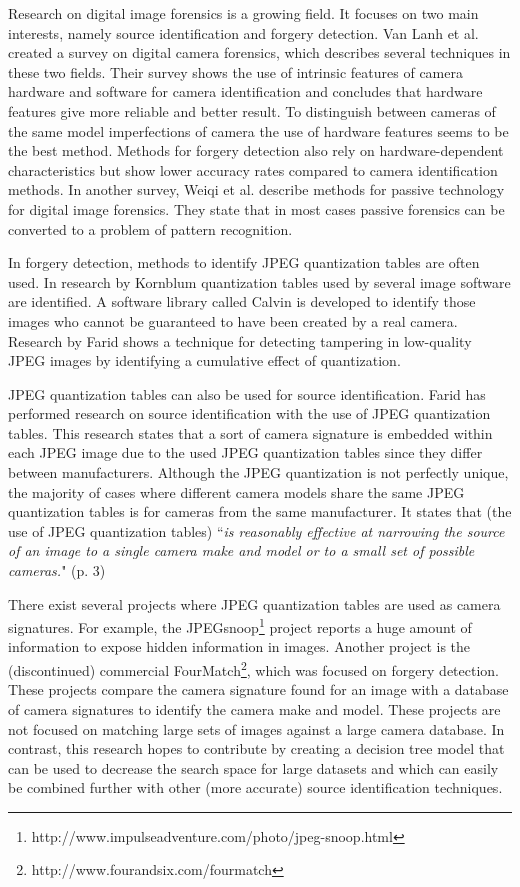 Research on digital image forensics is a growing field. It focuses on two main interests, namely source identification and forgery detection. Van Lanh et al. \cite{van2007survey} created a survey on digital camera forensics, which describes several techniques in these two fields. Their survey shows the use of intrinsic features of camera hardware and software for camera identification and concludes that hardware features give more reliable and better result. To distinguish between cameras of the same model imperfections of camera the use of hardware features seems to be the best method. Methods for forgery detection also rely on hardware-dependent characteristics but show lower accuracy rates compared to camera identification methods. In another survey, Weiqi et al. \cite{luo2007survey} describe methods for passive technology for digital image forensics. They state that in most cases passive forensics can be converted to a problem of pattern recognition.

In forgery detection, methods to identify JPEG quantization tables are often used. In research by Kornblum\cite{kornblum2008using} quantization tables used by several image software are identified. A software library called Calvin is developed to identify those images who cannot
be guaranteed to have been created by a real camera. Research by Farid\cite{4773149} shows a technique for detecting tampering in low-quality JPEG images by identifying a cumulative effect of quantization.

JPEG quantization tables can also be used for source identification. Farid has performed research\cite{farid1}\cite{farid2008digital} on source identification with the use of JPEG quantization tables. This research states that a sort of camera signature is embedded within each JPEG image due to the used JPEG quantization tables since they differ between manufacturers. Although the JPEG quantization is not perfectly unique, the majority of cases where different camera models share the same JPEG quantization tables is for cameras from the same manufacturer. It states that (the use of JPEG quantization tables) ``\textit{is reasonably effective at narrowing the source of an image to a single camera make and model or to a small set of possible cameras.}" (p. 3)

There exist several projects where JPEG quantization tables are used as camera signatures. For example, the JPEGsnoop\footnote{http://www.impulseadventure.com/photo/jpeg-snoop.html} project reports a huge amount of information to expose hidden information in images. Another project is the (discontinued) commercial FourMatch\footnote{http://www.fourandsix.com/fourmatch}, which was focused on forgery detection. These projects compare the camera signature found for an image with a database of camera signatures to identify the camera make and model. These projects are not focused on matching large sets of images against a large camera database. In contrast, this research hopes to contribute by creating a decision tree model that can be used to decrease the search space for large datasets and which can easily be combined further with other (more accurate) source identification techniques. 





